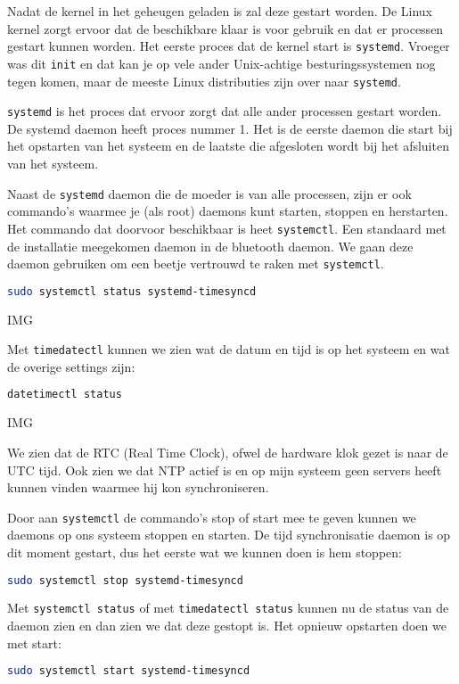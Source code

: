 Nadat de kernel in het geheugen geladen is zal deze gestart worden. De Linux kernel zorgt ervoor dat de beschikbare klaar is voor gebruik en dat er processen gestart kunnen worden. Het eerste proces dat de kernel start is \texttt{systemd}. Vroeger was dit \texttt{init} en dat kan je op vele ander Unix-achtige besturingssystemen nog tegen komen, maar de meeste Linux distributies zijn over naar \texttt{systemd}.

\texttt{systemd} is het proces dat ervoor zorgt dat alle ander processen gestart worden. De systemd daemon heeft proces nummer 1. Het is de eerste daemon die start bij het opstarten van het systeem en de laatste die afgesloten wordt bij het afsluiten van het systeem.

Naast de \texttt{systemd} daemon die de moeder is van alle processen, zijn er ook commando's waarmee je (als root) daemons kunt starten, stoppen en herstarten. Het commando dat doorvoor beschikbaar is heet \texttt{systemctl}. Een standaard met de installatie meegekomen daemon in de bluetooth daemon. We gaan deze daemon gebruiken om een beetje vertrouwd te raken met \texttt{systemctl}.

\begin{lstlisting}[language=bash]
sudo systemctl status systemd-timesyncd
\end{lstlisting}

IMG

Met \texttt{timedatectl} kunnen we zien wat de datum en tijd is op het systeem en wat de overige settings zijn:
\begin{lstlisting}[language=bash]
datetimectl status
\end{lstlisting}

IMG

We zien dat de RTC (Real Time Clock), ofwel de hardware klok gezet is naar de UTC tijd. Ook zien we dat NTP actief is en op mijn systeem geen servers heeft kunnen vinden waarmee hij kon synchroniseren.

Door aan \texttt{systemctl} de commando's stop of start mee te geven kunnen we daemons op ons systeem stoppen en starten. De tijd synchronisatie daemon is op dit moment gestart, dus het eerste wat we kunnen doen is hem stoppen:

\begin{lstlisting}[language=bash]
sudo systemctl stop systemd-timesyncd
\end{lstlisting}

Met \texttt{systemctl status} of met \texttt{timedatectl status} kunnen nu de status van de daemon zien en dan zien we dat deze gestopt is. Het opnieuw opstarten doen we met start:

\begin{lstlisting}[language=bash]
sudo systemctl start systemd-timesyncd
\end{lstlisting}
